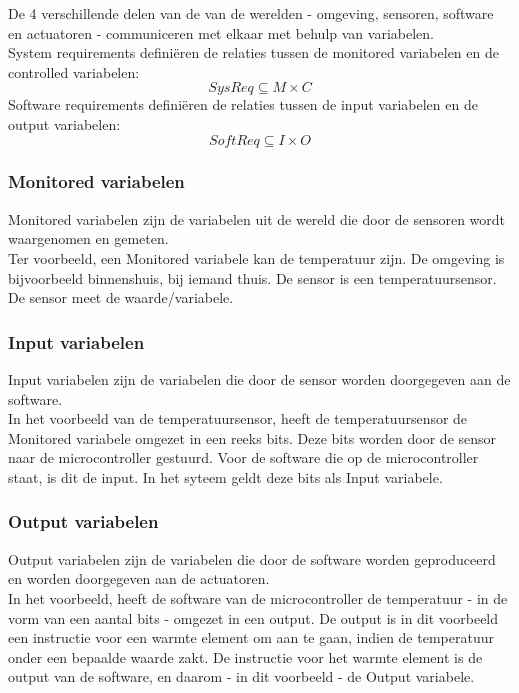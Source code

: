 \documentclass{article}
\begin{document}
\noindent
De 4 verschillende delen van de van de werelden - omgeving, sensoren, software en actuatoren - communiceren met elkaar met behulp van variabelen. \\
		System requirements definiëren de relaties tussen de monitored variabelen en de controlled variabelen:
		\[ SysReq \subseteq M \times C\]
		Software requirements definiëren de relaties tussen de input variabelen en de output variabelen:
		\[ SoftReq \subseteq I \times O \]
		
			\subsubsection{Monitored variabelen}
			
			Monitored variabelen zijn de variabelen uit de wereld die door de sensoren wordt waargenomen en gemeten. \\
			Ter voorbeeld, een Monitored variabele kan de temperatuur zijn. De omgeving is bijvoorbeeld binnenshuis, bij iemand thuis. De sensor is een temperatuursensor. De sensor meet de waarde/variabele. \par
			
			\subsubsection{Input variabelen}
			
			Input variabelen zijn de variabelen die door de sensor worden doorgegeven aan de software. \\
			In het voorbeeld van de temperatuursensor, heeft de temperatuursensor de Monitored variabele omgezet in een reeks bits. Deze bits worden door de sensor naar de microcontroller gestuurd. Voor de software die op de microcontroller staat, is dit de input. In het syteem geldt deze bits als Input variabele. \par
			
			\subsubsection{Output variabelen}
			
			Output variabelen zijn de variabelen die door de software worden geproduceerd en worden doorgegeven aan de actuatoren. \\
			In het voorbeeld, heeft de software van de microcontroller de temperatuur - in de vorm van een aantal bits - omgezet in een output. De output is in dit voorbeeld een instructie voor een warmte element om aan te gaan, indien de temperatuur onder een bepaalde waarde zakt. De instructie voor het warmte element is de output van de software, en daarom - in dit voorbeeld - de Output variabele. \par
\end{document}

